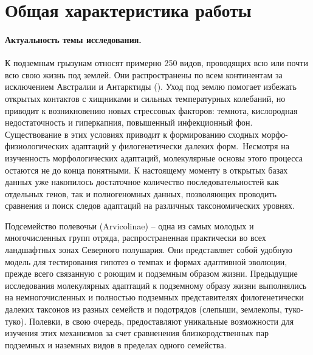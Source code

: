 \section*{Общая характеристика работы}

\paragraph{Актуальность темы исследования.} К подземным грызунам относят примерно 250 видов, проводящих всю или почти всю свою жизнь под землей. Они распространены по всем континентам за исключением Австралии и Антарктиды (\cite{Fang2015}). Уход под землю помогает избежать открытых контактов с хищниками и сильных температурных колебаний, но приводит к возникновению новых стрессовых факторов: темнота, кислородная недостаточность и гиперкапния, повышенный инфекционный фон. Существование в этих условиях приводит к формированию сходных морфо-физиологических адаптаций у филогенетически далеких форм. Несмотря на изученность морфологических адаптаций, молекулярные основы этого процесса остаются не до конца понятными. К настоящему моменту в открытых базах данных уже накопилось достаточное количество последовательностей как отдельных генов, так и полногеномных данных, позволяющих проводить сравнения и поиск следов адаптаций на различных таксономических уровнях.

Подсемейство полевочьи (Arvicolinae) -- одна из самых молодых и многочисленных групп отряда, распространенная практически во всех ландшафтных зонах Северного полушария. Они представляет собой удобную модель для тестирования гипотез о темпах и формах адаптивной эволюции, прежде всего связанную с роющим и подземным образом жизни. Предыдущие исследования молекулярных адаптаций к подземному образу жизни выполнялись на немногочисленных и полностью подземных представителях филогенетически далеких таксонов из разных семейств и подотрядов (слепыши, землекопы, туко-туко). Полевки, в свою очередь, предоставляют уникальные возможности для изучения этих механизмов за счет сравненения близкородственных пар подземных и наземных видов в пределах одного семейства. 




